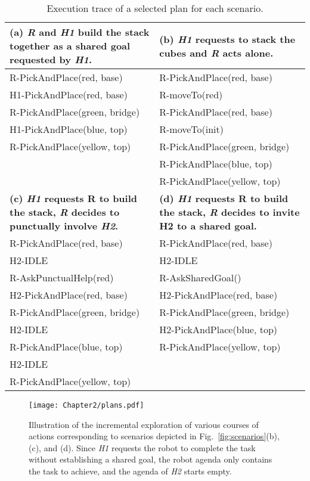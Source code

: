 \begin{table}
\small
\begin{tabularx}{0.98\textwidth}{|X||X|}
    \hline
    \textbf{(a) \textit{R} and \textit{H1} build the stack together as a shared goal requested by \textit{H1}.}     & \textbf{(b) \textit{H1} requests to stack the cubes and \textit{R} acts alone.} \\
    \hline
    R-PickAndPlace(red, base)     & R-PickAndPlace(red, base) \\ 
    H1-PickAndPlace(red, base)     & R-moveTo(red) \\  
    R-PickAndPlace(green, bridge) & R-PickAndPlace(red, base) \\
    H1-PickAndPlace(blue, top)     & R-moveTo(init) \\
    R-PickAndPlace(yellow, top)   & R-PickAndPlace(green, bridge) \\
                                    & R-PickAndPlace(blue, top) \\
                                    & R-PickAndPlace(yellow, top) \\
    \hline \hline
    \textbf{(c) \textit{H1} requests R to build the stack, \textit{R} decides to punctually involve \textit{H2}.} & \textbf{(d) \textit{H1} requests R to build the stack, \textit{R} decides to invite H2 to a shared goal.} \\
    \hline
    R-PickAndPlace(red, base)     & R-PickAndPlace(red, base) \\
    H2-IDLE                        & H2-IDLE \\
    R-AskPunctualHelp(red)        & R-AskSharedGoal() \\
    H2-PickAndPlace(red, base)     & H2-PickAndPlace(red, base) \\
    R-PickAndPlace(green, bridge) & R-PickAndPlace(green, bridge) \\
    H2-IDLE                        & H2-PickAndPlace(blue, top) \\
    R-PickAndPlace(blue, top)     & R-PickAndPlace(yellow, top) \\
    H2-IDLE                        & \\
    R-PickAndPlace(yellow, top)   & \\
    \hline
\end{tabularx}
\caption{Execution trace of a selected plan for each scenario.}
\label{tab:plans}
\end{table}

\begin{sidewaysfigure}
    \centering 
    \texttt{[image: Chapter2/plans.pdf]}
    \caption{Illustration of the incremental exploration of various courses of actions corresponding to scenarios depicted in Fig.~\ref{fig:scenarios}(b), (c), and (d). Since \textit{H1} requests the robot to complete the task without establishing a shared goal, the robot agenda only contains the task to achieve, and the agenda of \textit{H2} starts empty.}
    \label{fig:plans}
\end{sidewaysfigure}

